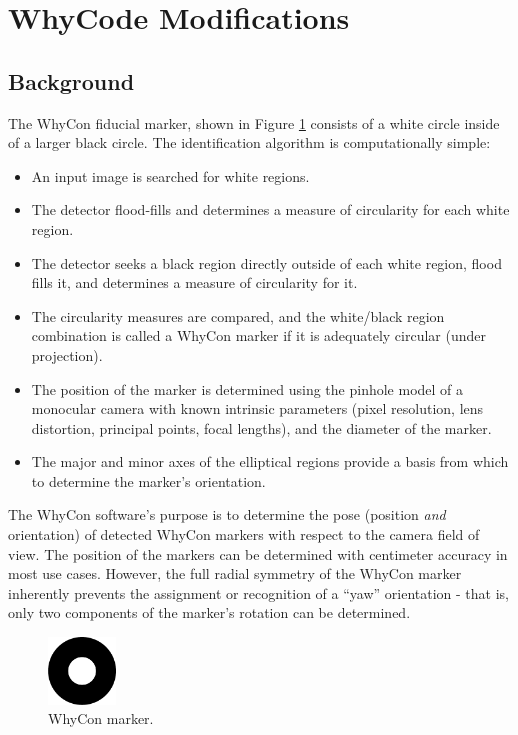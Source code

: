 \section{WhyCode Modifications}
\label{section:whycode_modifications}

\subsection{Background}

The WhyCon fiducial marker, shown in Figure \ref{fig:whycon} consists of a white circle inside of a larger black circle.
The identification algorithm is computationally simple:
\begin{itemize}
    \item An input image is searched for white regions.
    \item The detector flood-fills and determines a measure of circularity for each white region.
    \item The detector seeks a black region directly outside of each white region, flood fills it, and determines a measure of circularity for it.
    \item The circularity measures are compared, and the white/black region combination is called a WhyCon marker if it is adequately circular (under projection).
    \item The position of the marker is determined using the pinhole model of a monocular camera with known intrinsic parameters
            (pixel resolution, lens distortion, principal points, focal lengths), and the diameter of the marker.
    \item The major and minor axes of the elliptical regions provide a basis from which to determine the marker's orientation.
\end{itemize}

The WhyCon software's purpose is to determine the pose (position \textit{and} orientation) of detected WhyCon markers
with respect to the camera field of view.
The position of the markers can be determined with centimeter accuracy in most use cases.
However, the full radial symmetry of the WhyCon marker inherently prevents the assignment or recognition
of a ``yaw'' orientation - that is, only two components of the marker's rotation can be determined.

\begin{figure}
    \centering
    \includegraphics[width=0.16\textwidth]{images/whycon_example.png}
    \caption{WhyCon marker.}
    \label{fig:whycon}
\end{figure}

